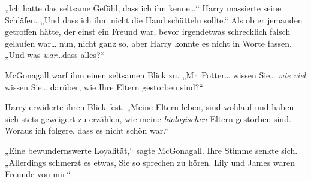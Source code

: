 „Ich hatte das seltsame Gefühl, dass ich ihn kenne…“ Harry massierte seine Schläfen. „Und dass ich ihm nicht die Hand schütteln sollte.“ Als ob er jemanden getroffen hätte, der einst ein Freund war, bevor irgendetwas schrecklich falsch gelaufen war… nun, nicht ganz so, aber Harry konnte es nicht in Worte fassen. „Und was \emph{war}…dass alles?“

McGonagall warf ihm einen seltsamen Blick zu. „Mr~Potter… wissen Sie… \emph{wie viel} wissen Sie… darüber, wie Ihre Eltern gestorben sind?“

Harry erwiderte ihren Blick fest. „Meine Eltern leben, sind wohlauf und haben sich stets geweigert zu erzählen, wie meine \emph{biologischen} Eltern gestorben sind. Woraus ich folgere, dass es nicht schön war.“

„Eine bewundernswerte Loyalität,“ sagte McGonagall. Ihre Stimme senkte sich. „Allerdings schmerzt es etwas, Sie so sprechen zu hören. Lily und James waren Freunde von mir.“

